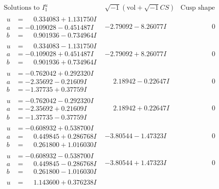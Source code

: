 \documentclass[1p]{elsarticle_modified}
\theoremstyle{definition}
\newcommand{\I}{\sqrt{-1}}
\begin{document}
$$\begin{array}{c|c|c}
\text{Solutions to }I^u_{1}& \I (\text{vol} + \sqrt{-1}CS) & \text{Cusp shape}\\
 \hline 
\begin{aligned}
u &= \phantom{-}0.334083 + 1.131750 I \\
a &= -0.109028 - 0.451487 I \\
b &= \phantom{-}0.901936 - 0.734964 I\end{aligned}
 & -2.79092 - 8.26077 I & \phantom{-0.000000 } 0 \\ \hline\begin{aligned}
u &= \phantom{-}0.334083 - 1.131750 I \\
a &= -0.109028 + 0.451487 I \\
b &= \phantom{-}0.901936 + 0.734964 I\end{aligned}
 & -2.79092 + 8.26077 I & \phantom{-0.000000 } 0 \\ \hline\begin{aligned}
u &= -0.762042 + 0.292320 I \\
a &= -2.35692 - 0.21609 I \\
b &= -1.37735 + 0.37759 I\end{aligned}
 & \phantom{-}2.18942 - 0.22647 I & \phantom{-0.000000 } 0 \\ \hline\begin{aligned}
u &= -0.762042 - 0.292320 I \\
a &= -2.35692 + 0.21609 I \\
b &= -1.37735 - 0.37759 I\end{aligned}
 & \phantom{-}2.18942 + 0.22647 I & \phantom{-0.000000 } 0 \\ \hline\begin{aligned}
u &= -0.608932 + 0.538700 I \\
a &= \phantom{-}0.449845 + 0.286768 I \\
b &= \phantom{-}0.261800 + 1.016030 I\end{aligned}
 & -3.80544 - 1.47323 I & \phantom{-0.000000 } 0 \\ \hline\begin{aligned}
u &= -0.608932 - 0.538700 I \\
a &= \phantom{-}0.449845 - 0.286768 I \\
b &= \phantom{-}0.261800 - 1.016030 I\end{aligned}
 & -3.80544 + 1.47323 I & \phantom{-0.000000 } 0 \\ \hline\begin{aligned}
u &= \phantom{-}1.143600 + 0.376238 I \\

\end{aligned}
\end{array}$$
\end{document}
